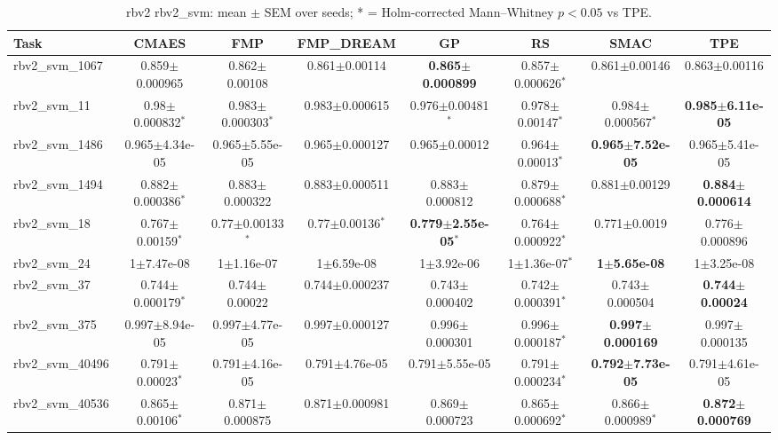 \begin{table}[t]
\caption{rbv2 rbv2_svm: mean $\pm$ SEM over seeds; * = Holm-corrected Mann--Whitney $p<0.05$ vs TPE.}
\label{tab:rbv2_rbv2_svm}
\begin{center}\small
\begin{tabular}{lccccccc}
\hline
Task & CMAES & FMP & FMP\_DREAM & GP & RS & SMAC & TPE \\
\hline
rbv2\_svm\_1067 & 0.859$\pm$0.000965 & 0.862$\pm$0.00108 & 0.861$\pm$0.00114 & \textbf{0.865$\pm$0.000899} & 0.857$\pm$0.000626$^{*}$ & 0.861$\pm$0.00146 & 0.863$\pm$0.00116 \\
rbv2\_svm\_11 & 0.98$\pm$0.000832$^{*}$ & 0.983$\pm$0.000303$^{*}$ & 0.983$\pm$0.000615 & 0.976$\pm$0.00481$^{*}$ & 0.978$\pm$0.00147$^{*}$ & 0.984$\pm$0.000567$^{*}$ & \textbf{0.985$\pm$6.11e-05} \\
rbv2\_svm\_1486 & 0.965$\pm$4.34e-05 & 0.965$\pm$5.55e-05 & 0.965$\pm$0.000127 & 0.965$\pm$0.00012 & 0.964$\pm$0.00013$^{*}$ & \textbf{0.965$\pm$7.52e-05} & 0.965$\pm$5.41e-05 \\
rbv2\_svm\_1494 & 0.882$\pm$0.000386$^{*}$ & 0.883$\pm$0.000322 & 0.883$\pm$0.000511 & 0.883$\pm$0.000812 & 0.879$\pm$0.000688$^{*}$ & 0.881$\pm$0.00129 & \textbf{0.884$\pm$0.000614} \\
rbv2\_svm\_18 & 0.767$\pm$0.00159$^{*}$ & 0.77$\pm$0.00133$^{*}$ & 0.77$\pm$0.00136$^{*}$ & \textbf{0.779$\pm$2.55e-05}$^{*}$ & 0.764$\pm$0.000922$^{*}$ & 0.771$\pm$0.0019 & 0.776$\pm$0.000896 \\
rbv2\_svm\_24 & 1$\pm$7.47e-08 & 1$\pm$1.16e-07 & 1$\pm$6.59e-08 & 1$\pm$3.92e-06 & 1$\pm$1.36e-07$^{*}$ & \textbf{1$\pm$5.65e-08} & 1$\pm$3.25e-08 \\
rbv2\_svm\_37 & 0.744$\pm$0.000179$^{*}$ & 0.744$\pm$0.00022 & 0.744$\pm$0.000237 & 0.743$\pm$0.000402 & 0.742$\pm$0.000391$^{*}$ & 0.743$\pm$0.000504 & \textbf{0.744$\pm$0.00024} \\
rbv2\_svm\_375 & 0.997$\pm$8.94e-05 & 0.997$\pm$4.77e-05 & 0.997$\pm$0.000127 & 0.996$\pm$0.000301 & 0.996$\pm$0.000187$^{*}$ & \textbf{0.997$\pm$0.000169} & 0.997$\pm$0.000135 \\
rbv2\_svm\_40496 & 0.791$\pm$0.00023$^{*}$ & 0.791$\pm$4.16e-05 & 0.791$\pm$4.76e-05 & 0.791$\pm$5.55e-05 & 0.791$\pm$0.000234$^{*}$ & \textbf{0.792$\pm$7.73e-05} & 0.791$\pm$4.61e-05 \\
rbv2\_svm\_40536 & 0.865$\pm$0.00106$^{*}$ & 0.871$\pm$0.000875 & 0.871$\pm$0.000981 & 0.869$\pm$0.000723 & 0.865$\pm$0.000692$^{*}$ & 0.866$\pm$0.000989$^{*}$ & \textbf{0.872$\pm$0.000769} \\

\end{tabular}
\end{center}
\end{table}
